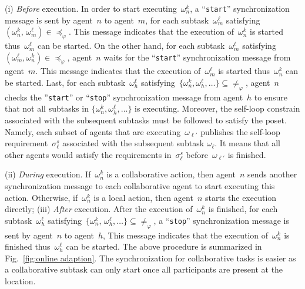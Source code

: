 (i) \emph{Before} execution.
In order to start executing~$\omega^k_n$,
a ``\texttt{start}'' synchronization message is sent by agent~$n$ to agent~$m$,
for each subtask~$\omega^\ell_m$
satisfying~$(\omega^k_n,\,\omega^\ell_m)\in \preceq_{\varphi}$.
This message indicates that the execution of~$\omega^k_n$ is started
thus~$\omega^\ell_m$ can be started.
On the other hand, for each subtask~$\omega^\ell_m$
satisfying~$(\omega^\ell_m, \omega^k_n)\in \preceq_{\varphi}$,
agent~$n$ waits for the ``\texttt{start}'' synchronization message
from agent~$m$.
This message indicates that the execution of~$\omega^\ell_m$ is started
thus~$\omega^k_n$ can be started.
Last, for each subtask~$\omega^\ell_h$
satisfying~$\{\omega^k_n,\omega^\ell_h,\dots\}\subseteq \neq_{\varphi}$,
agent~$n$ checks the ''\texttt{start}'' or ``\texttt{stop}'' synchronization message
from agent~$h$ to ensure that not all subtasks in $\{\omega^k_n,\omega^\ell_h,\dots\}$ is executing.
Moreover, the self-loop constrain associated with the subsequent subtasks must be
followed to satisfy the poset.
Namely, each subset of agents that are executing~$\omega_{\ell'}$ publishes
the self-loop requirement~$\sigma^s_\ell$ associated with the subsequent subtask $\omega_\ell$.
It means that all other agents would satisfy the requirements in~$\sigma^s_\ell$
before~$\omega_{\ell'}$ is finished.


(ii) \emph{During} execution.
If~$\omega^k_n$ is a collaborative action, then
agent~$n$ sends another synchronization message to each collaborative agent
to start executing this action.
Otherwise, if~$\omega^k_n$ is a local action, then agent~$n$ starts the
execution directly;
(iii) \emph{After} execution.
After the execution of~$\omega^k_n$ is finished,
for each subtask~$\omega^\ell_h$
satisfying~$\{\omega^k_n,\,\omega^\ell_h,\dots\}\subseteq \neq_{\varphi}$,
a ``\texttt{stop}'' synchronization message is sent by agent~$n$ to agent~$h$,
This message indicates that the execution of~$\omega^k_n$ is finished
thus~$\omega^\ell_h$ can be started.
The above procedure is summarized in Fig.~\ref{fig:online adaption}.
The synchronization for collaborative tasks is easier as a collaborative
subtask can only start once all participants are present at the location.

